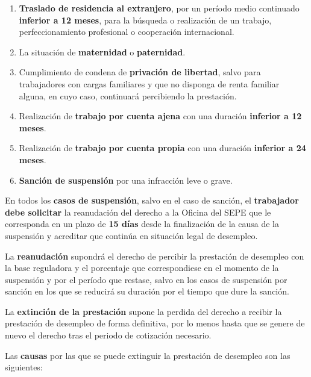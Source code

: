 \begin{enumerate}
    \item \textbf{Traslado de residencia al extranjero}, por un período medio continuado \textbf{inferior a 12 meses}, para la búsqueda o realización de un trabajo, perfeccionamiento profesional o cooperación internacional.
    \item La situación de \textbf{maternidad} o \textbf{paternidad}.
    \item Cumplimiento de condena de \textbf{privación de libertad}, salvo para trabajadores con cargas familiares y que no disponga de renta familiar alguna, en cuyo caso, continuará percibiendo la prestación.
    \item Realización de \textbf{trabajo por cuenta ajena} con una duración \textbf{inferior a 12 meses}.
    \item Realización de \textbf{trabajo por cuenta propia} con una duración \textbf{inferior a 24 meses}.
    \item \textbf{Sanción de suspensión} por una infracción leve o grave.
\end{enumerate}

En todos los \textbf{casos de suspensión}, salvo en el caso de sanción, el \textbf{trabajador debe solicitar} la reanudación del derecho a la Oficina del SEPE que le corresponda en un plazo de \textbf{15 días} desde la finalización de la causa de la suspensión y acreditar que continúa en situación legal de desempleo.

La \textbf{reanudación} supondrá el derecho de percibir la prestación de desempleo con la base reguladora y el porcentaje que correspondiese en el momento de la suspensión y por el período que restase, salvo en los casos de suspensión por sanción en los que se reducirá su duración por el tiempo que dure la sanción.

La \textbf{extinción de la prestación} supone la perdida del derecho a recibir la prestación de desempleo de forma definitiva, por lo menos hasta que se genere de nuevo el derecho tras el periodo de cotización necesario.

Las \textbf{causas} por las que se puede extinguir la prestación de desempleo son las siguientes:

